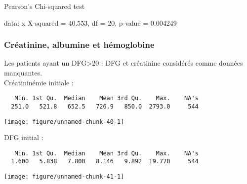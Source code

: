 \documentclass[11pt,a4paper]{article}\usepackage[]{graphicx}\usepackage[]{color}
\makeatletter
\def\maxwidth{ %
  \ifdim\Gin@nat@width>\linewidth
    \linewidth
  \else
    \Gin@nat@width
  \fi
}
\newenvironment{kframe}{%
 \def\at@end@of@kframe{}%
 \ifinner\ifhmode%
  \def\at@end@of@kframe{\end{minipage}}%
  \begin{minipage}{\columnwidth}%
 \fi\fi%
 \def\FrameCommand##1{\hskip\@totalleftmargin \hskip-\fboxsep
 \colorbox{shadecolor}{##1}\hskip-\fboxsep
     \hskip-\linewidth \hskip-\@totalleftmargin \hskip\columnwidth}%
 \MakeFramed {\advance\hsize-\width
   \@totalleftmargin\z@ \linewidth\hsize
   \@setminipage}}%
 {\par\unskip\endMakeFramed%
 \at@end@of@kframe}
\newenvironment{knitrout}{}{} %
\makeatother
\begin{document}
	Pearson's Chi-squared test

data:  x
X-squared = 40.553, df = 20, p-value = 0.004249



    \subsubsection{Créatinine, albumine et hémoglobine}

Les patients ayant un DFG\textgreater20 : DFG et créatinine considérés comme données manquantes.
~\\

Créatininémie initiale :

\begin{knitrout}
\color{fgcolor}\begin{kframe}
\begin{verbatim}
   Min. 1st Qu.  Median    Mean 3rd Qu.    Max.    NA's 
  251.0   521.8   652.5   726.9   850.0  2793.0     544 
\end{verbatim}
\end{kframe}
\texttt{[image: figure/unnamed-chunk-40-1]} 

\end{knitrout}

DFG initial :

\begin{knitrout}
\color{fgcolor}\begin{kframe}
\begin{verbatim}
   Min. 1st Qu.  Median    Mean 3rd Qu.    Max.    NA's 
  1.600   5.838   7.800   8.146   9.892  19.770     544 
\end{verbatim}
\end{kframe}
\texttt{[image: figure/unnamed-chunk-41-1]} 

\end{knitrout}
\end{document}
